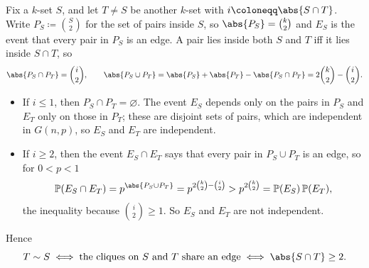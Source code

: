 Fix a \(k\)-set \(S\), and let \(T \ne S\) be another \(k\)-set with \(i \coloneqq \abs{S \cap T}\). Write \(P_S \coloneqq \binom{S}{2}\) for the set of pairs inside \(S\), so \(\abs{P_S} = \binom{k}{2}\) and \(E_S\) is the event that every pair in \(P_S\) is an edge. A pair lies inside both \(S\) and \(T\) iff it lies inside \(S \cap T\), so
\[
    \abs{P_S \cap P_T} = \binom{i}{2},
    \qquad
    \abs{P_S \cup P_T} = \abs{P_S} + \abs{P_T} - \abs{P_S \cap P_T} = 2\binom{k}{2} - \binom{i}{2}.
\]
\begin{itemize}
    \item If \(i \le 1\), then \(P_S \cap P_T = \varnothing\). The event \(E_S\) depends only on the pairs in \(P_S\) and \(E_T\) only on those in \(P_T\); these are disjoint sets of pairs, which are independent in \(G(n,p)\), so \(E_S\) and \(E_T\) are independent.
    \item If \(i \ge 2\), then the event \(E_S \cap E_T\) says that every pair in \(P_S \cup P_T\) is an edge, so for \(0 < p < 1\)
    \[
        \mathbb{P}(E_S \cap E_T) = p^{\abs{P_S \cup P_T}} = p^{2\binom{k}{2} - \binom{i}{2}} > p^{2\binom{k}{2}} = \mathbb{P}(E_S)\,\mathbb{P}(E_T),
    \]
    the inequality because \(\binom{i}{2} \ge 1\). So \(E_S\) and \(E_T\) are not independent.
\end{itemize}
Hence
\[
    T \sim S
    \iff \text{the cliques on } S \text{ and } T \text{ share an edge}
    \iff \abs{S \cap T} \ge 2 .
\]
